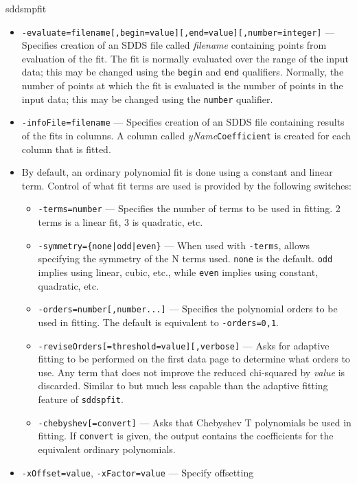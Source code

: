 \begin{sddsprog}{sddsmpfit}
\begin{itemize}
    \item \verb|-evaluate=filename[,begin=value][,end=value][,number=integer]| ---
      Specifies creation of an SDDS file called \emph{filename} containing
      points from evaluation of the fit. The fit is normally evaluated over
      the range of the input data; this may be changed using the
      \verb|begin| and \verb|end| qualifiers. Normally, the number of points
      at which the fit is evaluated is the number of points in the input data;
      this may be changed using the \verb|number| qualifier.
    \item \verb|-infoFile=filename| --- Specifies creation of an SDDS file
      containing results of the fits in columns. A column called
      \emph{yName}\verb|Coefficient| is created for each column that is
      fitted.
    \item By default, an ordinary polynomial fit is done using a constant and
      linear term. Control of what fit terms are used is provided by the
      following switches:
      \begin{itemize}
      \item \verb|-terms=number| --- Specifies the number of terms to be used
        in fitting. 2 terms is a linear fit, 3 is quadratic, etc.
      \item \verb!-symmetry={none|odd|even}! --- When used with \verb|-terms|,
        allows specifying the symmetry of the N terms used. \verb|none| is the
        default. \verb|odd| implies using linear, cubic, etc., while
        \verb|even| implies using constant, quadratic, etc.
      \item \verb|-orders=number[,number...]| --- Specifies the polynomial
        orders to be used in fitting. The default is equivalent to
        \verb|-orders=0,1|.
      \item \verb|-reviseOrders[=threshold=value][,verbose]| --- Asks for
        adaptive fitting to be performed on the first data page to determine
        what orders to use. Any term that does not improve the reduced
        chi-squared by \emph{value} is discarded. Similar to but much less
        capable than the adaptive fitting feature of \verb|sddspfit|.
      \item \verb|-chebyshev[=convert]| --- Asks that Chebyshev T polynomials
        be used in fitting. If \verb|convert| is given, the output contains the
        coefficients for the equivalent ordinary polynomials.
      \end{itemize}
    \item \verb|-xOffset=value|, \verb|-xFactor=value| --- Specify offsetting

\end{itemize}
\end{sddsprog}
